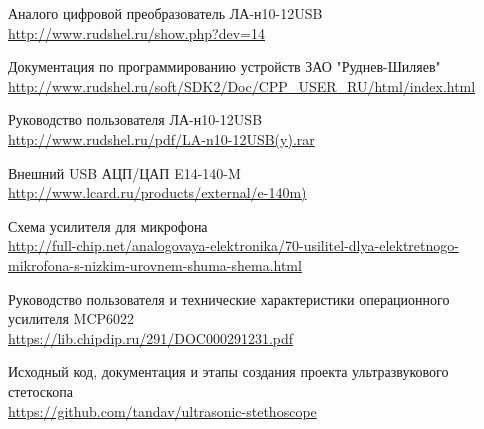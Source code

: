 \newpage
\renewcommand\refname{Ссылки на источники}
\begin{thebibliography}{}
Аналого цифровой преобразователь ЛА-н10-12USB\\
\url{http://www.rudshel.ru/show.php?dev=14}

Документация по программированию устройств ЗАО "Руднев-Шиляев"\\
\url{http://www.rudshel.ru/soft/SDK2/Doc/CPP_USER_RU/html/index.html}

Руководство пользователя ЛА-н10-12USB\\
\url{http://www.rudshel.ru/pdf/LA-n10-12USB(y).rar}

Внешний USB АЦП/ЦАП E14-140-M\\
\url{http://www.lcard.ru/products/external/e-140m)}

Схема усилителя для микрофона\\
\url{http://full-chip.net/analogovaya-elektronika/70-usilitel-dlya-elektretnogo-mikrofona-s-nizkim-urovnem-shuma-shema.html}

Руководство пользователя и технические характеристики операционного усилителя MCP6022\\
\url{https://lib.chipdip.ru/291/DOC000291231.pdf}

Исходный код, документация и этапы создания проекта ультразвукового стетоскопа\\
\url{https://github.com/tandav/ultrasonic-stethoscope}

\end{thebibliography}



